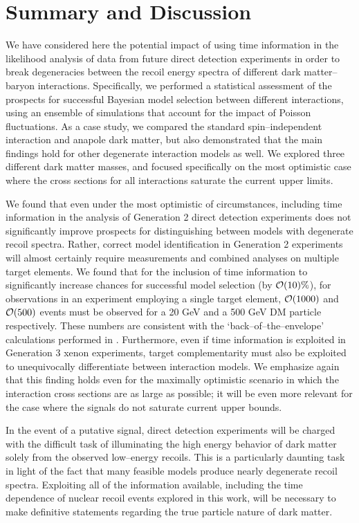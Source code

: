 \documentclass[11pt, a4paper]{article}
\begin{document}
\section{Summary and Discussion}\label{sec:conclusion}
We have considered here the potential impact of using time information in the likelihood analysis of data from future direct detection experiments in order to break degeneracies between the recoil energy spectra of different dark matter--baryon interactions. Specifically, we performed a statistical assessment of the prospects for successful Bayesian model selection between different interactions, using an ensemble of simulations that account for the impact of Poisson fluctuations. As a case study, we compared the standard spin--independent interaction and anapole dark matter, but also demonstrated that the main findings hold for other degenerate interaction models as well. We explored three different dark matter masses, and focused specifically on the most optimistic case where the cross sections for all interactions saturate the current upper limits. 

We found that even under the most optimistic of circumstances, including time information in the analysis of Generation 2 direct detection experiments does not significantly improve prospects for distinguishing between models with degenerate recoil spectra. Rather, correct model identification in Generation 2 experiments will almost certainly require measurements and combined analyses on multiple target elements. We found that for the inclusion of time information to significantly increase chances for successful model selection (by ${\cal O}(10)\%$), for observations in an experiment employing a single target element, ${\cal O}(1000)$ and ${\cal O}(500)$ events must be observed for a 20 GeV and a 500 GeV DM particle respectively. These numbers are consistent with the `back--of--the--envelope' calculations performed in \cite{DelNobile:2015nua}. Furthermore, even if time information is exploited in Generation 3 xenon experiments, target complementarity must also be exploited to unequivocally differentiate between interaction models. We emphasize again that this finding holds even for the maximally optimistic scenario in which the interaction cross sections are as large as possible; it will be even more relevant for the case where the signals do not saturate current upper bounds.

In the event of a putative signal, direct detection experiments will be charged with the difficult task of illuminating the high energy behavior of dark matter solely from the observed low--energy recoils. This is a particularly daunting task in light of the fact that many feasible models produce nearly degenerate recoil spectra. Exploiting all of the information available, including the time dependence of nuclear recoil events explored in this work, will be necessary to make definitive statements regarding the true particle nature of dark matter. 
\bigskip
\end{document}
